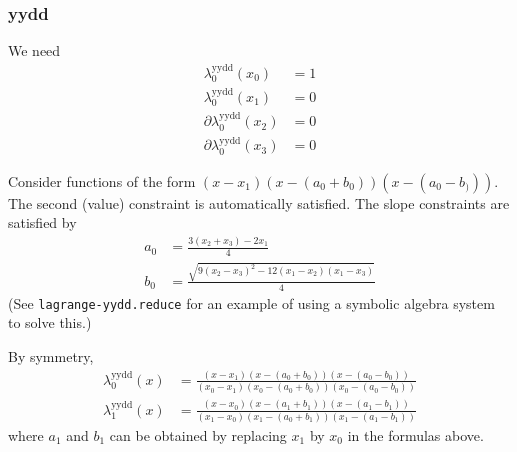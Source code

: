 \subsubsection{yydd}\label{sec:lagrange-yydd}

We need 
\begin{align}
\lambda^{\text{yydd}}_0(x_0) & = 1 \\ 
\lambda^{\text{yydd}}_0(x_1) & = 0 \nonumber \\
\partial\lambda^{\text{yydd}}_0(x_2) & = 0 \nonumber \\
\partial\lambda^{\text{yydd}}_0(x_3) & = 0 \nonumber 
\end{align}

Consider functions of the form $(x-x_1)(x-(a_0+b_0))(x-(a_0-b_)))$.
The second (value) constraint is automatically satisfied.
The slope constraints are satisfied by
\begin{align}
a_0 & = \frac{3 (x_2 + x_3) - 2 x_1}{4} \\ 
b_0 & = \frac{
\sqrt{ 9 (x_2 - x_3)^2 - 12 (x_1 - x_2) (x_1 -x_3)}
}
{4} \nonumber
\end{align}
(See \texttt{lagrange-yydd.reduce} for an example of using a
symbolic algebra system to solve this.)

By symmetry,  
\begin{align}
\lambda^{\text{yydd}}_0(x) & =
\frac{(x-x_1)(x-(a_0+b_0))(x-(a_0-b_0))}
{(x_0-x_1)(x_0-(a_0+b_0))(x_0-(a_0-b_0))}
\\
\lambda^{\text{yydd}}_1(x) & =
\frac{(x-x_0)(x-(a_1+b_1))(x-(a_1-b_1))}
{(x_1-x_0)(x_1-(a_0+b_1))(x_1-(a_1-b_1))}
\nonumber
\end{align}
where $a_1$ and $b_1$ can be obtained 
by replacing $x_1$ by $x_0$ in the formulas
above.

